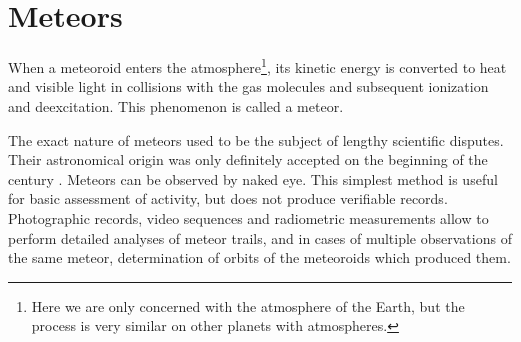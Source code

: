 
\section{Meteors} \label{il}
    When a meteoroid enters the atmosphere\footnote{Here we are only concerned with the atmosphere of the Earth,
    but the process is very similar on other planets with atmospheres.}, its kinetic energy
    is converted to heat and visible light in collisions with the gas molecules and subsequent ionization
    and deexcitation. This phenomenon is called a meteor.

    The exact nature of meteors used to be the subject of lengthy scientific disputes.
    Their astronomical origin was only definitely accepted on the beginning of the  century \citep{czegka2000}.
    Meteors can be observed by naked eye. This simplest method is useful for basic assessment of activity,
    but does not produce verifiable records. Photographic records, video sequences and radiometric measurements
    allow to perform detailed analyses of meteor trails, 
    and in cases of multiple observations of the same meteor, determination of orbits of the meteoroids which produced them.

